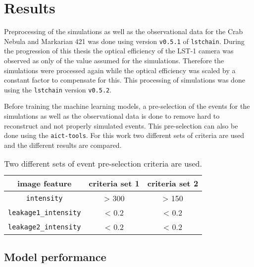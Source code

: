\chapter{Results}
\label{ch:results}
Preprocessing of the simulations as well as the observational data for the Crab Nebula and Markarian 421 was done using version \texttt{v0.5.1} of \texttt{lstchain}.
During the progression of this thesis the optical efficiency of the LST-1 camera was observed as only  of the value assumed for the simulations.
Therefore the simulations were processed again while the optical efficiency was scaled by a constant factor to compensate for this.
This processing of simulations was done using the \texttt{lstchain} version \texttt{v0.5.2}.

Before training the machine learning models, a pre-selection of the events for the simulations as well as the observational data is done to remove 
hard to reconstruct and not properly simulated events. 
This pre-selection can also be done using the \texttt{aict-tools}.
For this work two different sets of criteria are used and the different results are compared.
\begin{table}
    \centering
    \caption{Two different sets of event pre-selection criteria are used.}
    \begin{tabular}{c c c}
        \toprule
        image feature & criteria set 1 & criteria set 2 \\
        \midrule
        \texttt{intensity} & > 300 & > 150 \\
        \texttt{leakage1\_intensity} & < 0.2 & < 0.2 \\
        \texttt{leakage2\_intensity} & < 0.2 & < 0.2 \\
        \bottomrule
    \end{tabular}
\end{table}


\section{Model performance}
